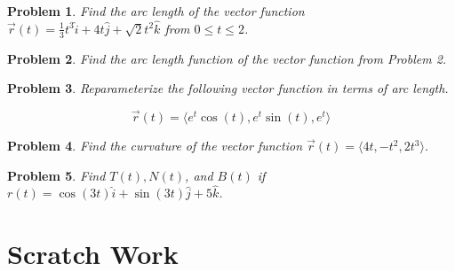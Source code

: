 \documentclass[11pt]{article}
\newtheorem{problem}{Problem}
\begin{document}
\begin{problem}
    Find the arc length of the vector function $
    \vec{r}(t) = \frac{1}{3}t^3 \hat{i} + 4t \hat{j} + \sqrt{2}t^2 \hat{k}$ from $0\leq t\leq 2$.
\end{problem}

\vspace{6cm}

\begin{problem}
    Find the arc length function of the vector function from Problem 2.
\end{problem}

\newpage

\begin{problem}
    Reparameterize the following vector function in terms of arc length.

    \begin{equation*}
        \vec{r}(t) = \langle   e^t \cos(t), e^t \sin(t), e^t \rangle 
    \end{equation*}
\end{problem}


\vspace{8.5cm}


\begin{problem}
    Find the curvature of the vector function $\vec{r}(t) = \langle 4t, -t^2, 2t^3 \rangle$.
\end{problem}

\vspace{11cm}

\begin{problem}
    Find $T(t),N(t)$, and $B(t)$ if $r(t) = \cos(3t)\hat{i} + \sin(3t)\hat{j} + 5\hat{k}$.
\end{problem}

\newpage

\section{Scratch Work}
\end{document}
